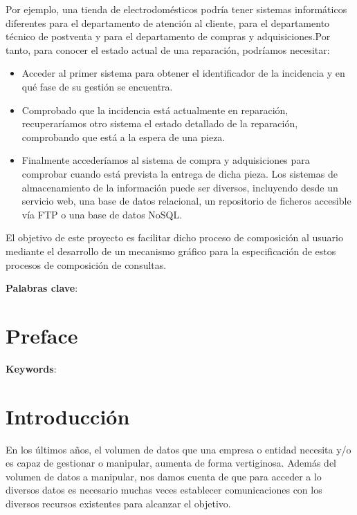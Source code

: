 \documentclass[a4paper,12pt]{article}
\newcounter{ns}
\begin{document}
	Por ejemplo, una tienda de electrodomésticos podría tener sistemas informáticos diferentes para el departamento de atención al cliente, para el departamento técnico de postventa y para el departamento de compras y adquisiciones.Por tanto, para conocer el estado actual de una reparación, podríamos necesitar:
		\begin{itemize}
			\item  Acceder al primer sistema para obtener el identificador de la incidencia y en qué fase de su gestión se encuentra.
			\item  Comprobado que la incidencia está actualmente en reparación, recuperaríamos otro sistema el estado detallado de la reparación, comprobando que está a la espera de una pieza.
			\item Finalmente accederíamos al sistema de compra y adquisiciones para comprobar cuando está prevista la entrega de dicha pieza. Los sistemas de almacenamiento de la información puede ser diversos, incluyendo desde un servicio web, una base de datos relacional, un repositorio de ficheros accesible vía FTP o una base de datos NoSQL.
		\end{itemize}
	
	\vspace{5mm}
	
	El objetivo de este proyecto es facilitar dicho proceso de composición al usuario mediante el desarrollo de un mecanismo gráfico para la especificación de estos procesos de composición de consultas.
	

	\vspace{5mm}
	
	\textbf{Palabras clave}: 
	\cleardoublepage
	
	\afterpage{\null\newpage}
	\newpage
	
	\section*{Preface}

	

	\textbf{Keywords}:
	\cleardoublepage
	
	\setcounter{page}{1}
	
	\afterpage{\null\newpage}
	\newpage
	
	\section{Introducción}
	
	En los últimos años, el volumen de datos que una empresa o entidad necesita y/o es capaz de gestionar o manipular, aumenta de forma vertiginosa. Además del volumen de datos a manipular, nos damos cuenta de que para acceder a lo diversos datos es necesario muchas veces establecer comunicaciones con los diversos recursos existentes para alcanzar el objetivo.
	
\end{document}
